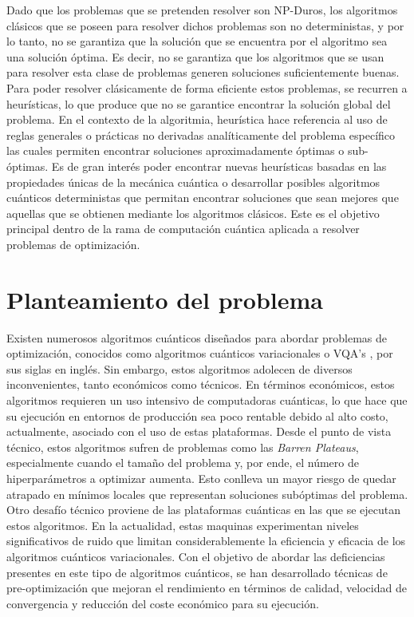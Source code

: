 \newpage

Dado que los problemas que se pretenden resolver son NP-Duros, los algoritmos clásicos que se poseen para resolver dichos problemas son no deterministas, y por lo tanto, no se garantiza que la solución que se encuentra por el algoritmo sea una solución óptima. Es decir, no se garantiza que los algoritmos que se usan para resolver esta clase de problemas generen soluciones suficientemente buenas. Para poder resolver clásicamente de forma eficiente estos problemas, se recurren a heurísticas, lo que produce que no se garantice encontrar la solución global del problema. En el contexto de la algoritmia, heurística hace referencia al uso de reglas generales o prácticas no derivadas analíticamente del problema específico las cuales permiten encontrar soluciones aproximadamente óptimas o sub-óptimas. Es de gran interés poder encontrar nuevas heurísticas basadas en las propiedades únicas de la mecánica cuántica o desarrollar posibles algoritmos cuánticos deterministas que permitan encontrar soluciones que sean mejores que aquellas que se obtienen mediante los algoritmos clásicos. Este es el objetivo principal dentro de la rama de computación cuántica aplicada a resolver problemas de optimización. 

\section{Planteamiento del problema}

Existen numerosos algoritmos cuánticos diseñados para abordar problemas de optimización, conocidos como algoritmos cuánticos variacionales o VQA's \citep{cerezo}, por sus siglas en inglés. Sin embargo, estos algoritmos adolecen de diversos inconvenientes, tanto económicos como técnicos. En términos económicos, estos algoritmos requieren un uso intensivo de computadoras cuánticas, lo que hace que su ejecución en entornos de producción sea poco rentable debido al alto costo, actualmente, asociado con el uso de estas plataformas. Desde el punto de vista técnico, estos algoritmos sufren de problemas como las \textit{Barren Plateaus}, especialmente cuando el tamaño del problema y, por ende, el número de hiperparámetros a optimizar aumenta. Esto conlleva un mayor riesgo de quedar atrapado en mínimos locales que representan soluciones subóptimas del problema. Otro desafío técnico proviene de las plataformas cuánticas en las que se ejecutan estos algoritmos. En la actualidad, estas maquinas experimentan niveles significativos de ruido que limitan considerablemente la eficiencia y eficacia de los algoritmos cuánticos variacionales. Con el objetivo de abordar las deficiencias presentes en este tipo de algoritmos cuánticos, se han desarrollado técnicas de pre-optimización que mejoran el rendimiento en términos de calidad, velocidad de convergencia y reducción del coste económico para su ejecución.

